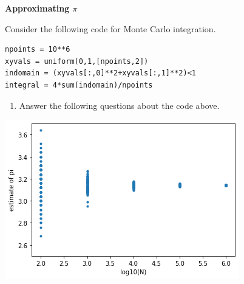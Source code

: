 \documentclass[12pt,letterpaper,noanswers]{exam}
\begin{document}
    
    

\noindent\textbf{Approximating $\pi$}

Consider the following code for Monte Carlo integration.
\begin{lstlisting}   
npoints = 10**6
xyvals = uniform(0,1,[npoints,2])
indomain = (xyvals[:,0]**2+xyvals[:,1]**2)<1
integral = 4*sum(indomain)/npoints
\end{lstlisting}
\begin{enumerate}[resume=classQ]
\item Answer the following questions about the code above.
\end{enumerate}




\includegraphics[width=0.5\linewidth]{img/C17piest.png}
\vspace{0.1cm}
\end{document}
